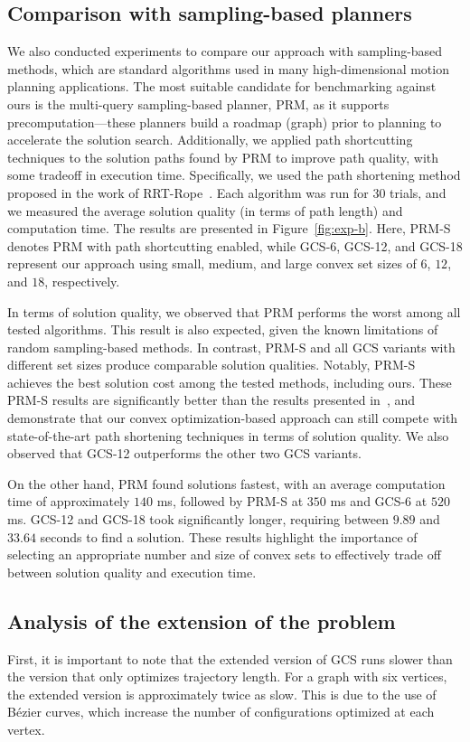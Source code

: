 \subsection{Comparison with sampling-based planners}\label{sec:sampling-based}

We also conducted experiments to compare our approach with sampling-based methods, which are standard algorithms used in many high-dimensional motion planning applications. The most suitable candidate for benchmarking against ours is the multi-query sampling-based planner, PRM, as it supports precomputation---these planners build a roadmap (graph) prior to planning to accelerate the solution search. Additionally, we applied path shortcutting techniques to the solution paths found by PRM to improve path quality, with some tradeoff in execution time. Specifically, we used the path shortening method proposed in the work of RRT-Rope~\cite{petit2021rrt}. Each algorithm was run for $30$ trials, and we measured the average solution quality (in terms of path length) and computation time. The results are presented in Figure~\ref{fig:exp-b}. Here, PRM-S denotes PRM with path shortcutting enabled, while GCS-6, GCS-12, and GCS-18 represent our approach using small, medium, and large convex set sizes of $6$, $12$, and $18$, respectively.

In terms of solution quality, we observed that PRM performs the worst among all tested algorithms. This result is also expected, given the known limitations of random sampling-based methods. In contrast, PRM-S and all GCS variants with different set sizes produce comparable solution qualities. Notably, PRM-S achieves the best solution cost among the tested methods, including ours. These PRM-S results are significantly better than the results presented in~\cite{marcucci2023motion}, and demonstrate that our convex optimization-based approach can still compete with state-of-the-art path shortening techniques in terms of solution quality. We also observed that GCS-12 outperforms the other two GCS variants.

On the other hand, PRM found solutions fastest, with an average computation time of approximately $140$ ms, followed by PRM-S at $350$ ms and GCS-6 at $520$ ms. GCS-12 and GCS-18 took significantly longer, requiring between $9.89$ and $33.64$ seconds to find a solution. These results highlight the importance of selecting an appropriate number and size of convex sets to effectively trade off between solution quality and execution time.

\subsection{Analysis of the extension of the problem}
First, it is important to note that the extended version of GCS runs slower than the version that only optimizes trajectory length. For a graph with six vertices, the extended version is approximately twice as slow. This is due to the use of B\'ezier curves, which increase the number of configurations optimized at each vertex.

